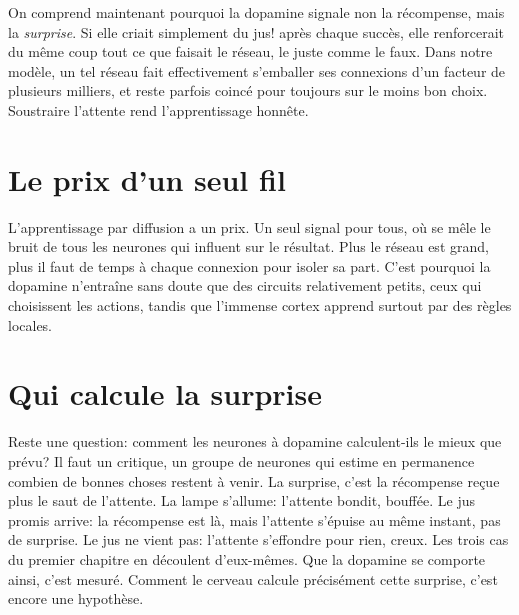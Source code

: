 On comprend maintenant pourquoi la dopamine signale non la récompense, mais la \emph{surprise}. Si elle criait simplement \og du jus!\fg{} après chaque succès, elle renforcerait du même coup tout ce que faisait le réseau, le juste comme le faux. Dans notre modèle, un tel réseau fait effectivement s'emballer ses connexions d'un facteur de plusieurs milliers, et reste parfois coincé pour toujours sur le moins bon choix. Soustraire l'attente rend l'apprentissage honnête.

\section*{Le prix d'un seul fil}

L'apprentissage par diffusion a un prix. Un seul signal pour tous, où se mêle le bruit de tous les neurones qui influent sur le résultat. Plus le réseau est grand, plus il faut de temps à chaque connexion pour isoler sa part. C'est pourquoi la dopamine n'entraîne sans doute que des circuits relativement petits, ceux qui choisissent les actions, tandis que l'immense cortex apprend surtout par des règles locales.

\section*{Qui calcule la surprise}

Reste une question: comment les neurones à dopamine calculent-ils le \og mieux que prévu\fg{}? Il faut un critique, un groupe de neurones qui estime en permanence combien de bonnes choses restent à venir. La surprise, c'est la récompense reçue plus le saut de l'attente. La lampe s'allume: l'attente bondit, bouffée. Le jus promis arrive: la récompense est là, mais l'attente s'épuise au même instant, pas de surprise. Le jus ne vient pas: l'attente s'effondre pour rien, creux. Les trois cas du premier chapitre en découlent d'eux-mêmes. Que la dopamine se comporte ainsi, c'est mesuré. Comment le cerveau calcule précisément cette surprise, c'est encore une hypothèse.

